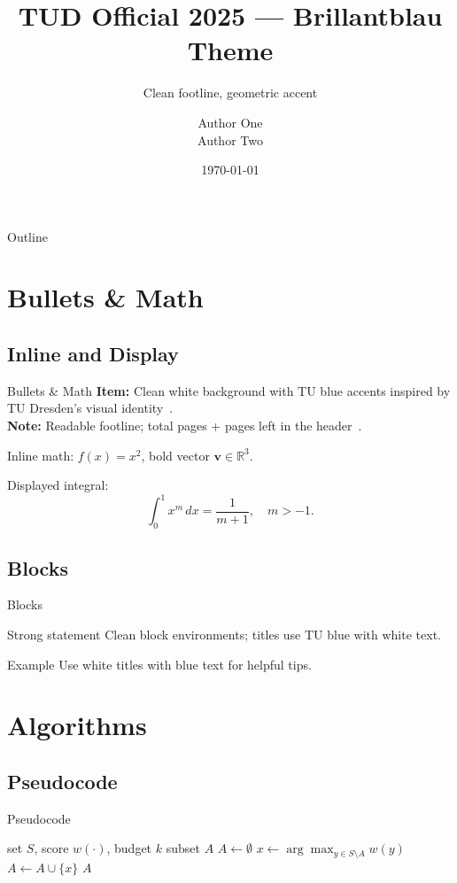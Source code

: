 \documentclass[aspectratio=169, xcolor=table]{beamer}
\title[Official Theme Demo]{TUD Official 2025 — Brillantblau Theme}
\subtitle{Clean footline, geometric accent}
\author[Presentation Team]{Author One \\ Author Two}
\institute[Faculty of Transportation and Traffic Sciences]{Faculty of Transportation and Traffic Sciences}
\date{\today}
\begin{document}
\TUDOfficialTitleFrame

\begin{frame}[allowframebreaks]{Outline}
  \tableofcontents
\end{frame}

\section{Bullets \& Math}
\subsection{Inline and Display}

\begin{frame}{Bullets \& Math}
  \textbf{Item:} Clean white background with TU blue accents inspired by TU Dresden's visual identity~\cite{dantzig1951}.\\
  \textbf{Note:} Readable footline; total pages + pages left in the header~\cite{berge1963}.

  \medskip
  Inline math: \( f(x)=x^2 \), bold vector \( \bm{v}\in\mathbb{R}^3 \).

  \medskip
  Displayed integral:
  \[
    \int_0^1 x^m\,dx = \frac{1}{m+1},\quad m> -1.
  \]
\end{frame}

\subsection{Blocks}

\begin{frame}{Blocks}
  \begin{block}{Strong statement}
    Clean block environments; titles use TU blue with white text.
  \end{block}
  \begin{exampleblock}{Example}
    Use white titles with blue text for helpful tips.
  \end{exampleblock}
\end{frame}

\section{Algorithms}
\subsection{Pseudocode}
\begin{frame}{Pseudocode}
  \begin{algorithm}[H]
    \caption{Greedy Selection (toy)}
    \begin{algorithmic}[1]
      \Require set $S$, score $w(\cdot)$, budget $k$
      \Ensure  subset $A$
      \State $A \gets \emptyset$
        \State $x \gets \arg\max_{y\in S\setminus A} w(y)$
        \State $A \gets A \cup \{x\}$
      \EndWhile
      \State \Return $A$
    \end{algorithmic}
  \end{algorithm}
\end{frame}
\end{document}
